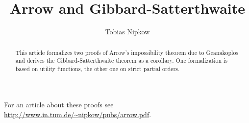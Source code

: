 \documentclass[11pt,a4paper]{article}
\begin{document}
\title{Arrow and Gibbard-Satterthwaite}
\author{Tobias Nipkow}
\maketitle

\begin{abstract}
This article formalizes two proofs of Arrow's impossibility theorem
due to Geanakoplos and derives the Gibbard-Satterthwaite theorem as a
corollary. One formalization is based on utility functions, the other
one on strict partial orders.
\end{abstract}

\noindent
For an article about these proofs see
\url{http://www.in.tum.de/~nipkow/pubs/arrow.pdf}.





\end{document}
